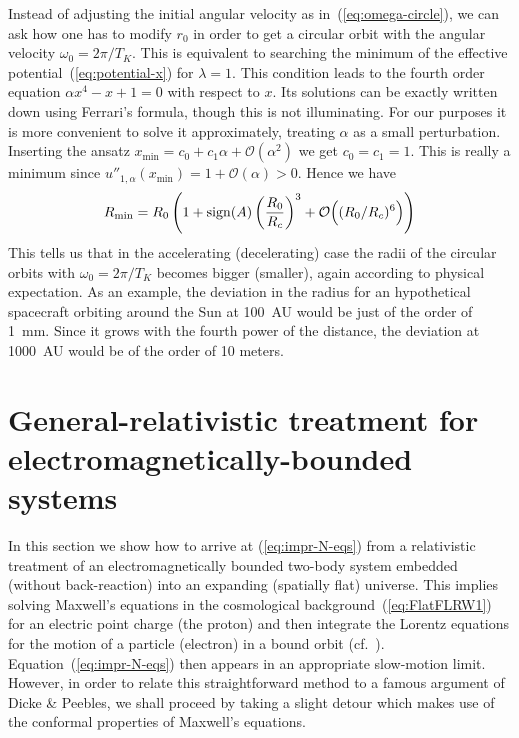 \documentclass
[rmp,aps,twocolumn,showpacs,preprintnumbers,amsmath,amssymb]{revtex4}
\theoremstyle{plain}
\theoremstyle{definition}
\theoremstyle{remark}
\newcommand{\Ord}{\mathcal{O}}                %
\begin{document}
Instead of adjusting the initial angular velocity as 
in~(\ref{eq:omega-circle}), we can ask how one has to modify 
$r_0$ in order to get a circular orbit with the angular velocity 
$\omega_0=2\pi/T_K$. This is equivalent to searching the minimum 
of the effective potential~(\ref{eq:potential-x}) for $\lambda=1$. 
This condition leads to the fourth order equation 
$\alpha x^4 - x + 1 = 0$ with respect to $x$. Its solutions can be 
exactly written down using Ferrari's formula, though this is not 
illuminating. For our purposes it is more convenient to solve it 
approximately, treating $\alpha$ as a small perturbation. 
Inserting the ansatz $x_{\mathrm{min}}=c_0+c_1\alpha+\Ord(\alpha^2)$ we get
$c_0=c_1=1$. This is really a minimum since 
$u''_{1,\alpha}(x_{\mathrm{min}})=1+\Ord(\alpha)>0$. Hence we have
%
\begin{equation}\label{eq:r-min}
R_{\rm min} = R_0
  \left( 1 + \mathrm{sign}(A)\left( \frac{R_0}{R_c} \right)^3 
           + \Ord\Big( (R_0/R_c)^6 \Big) 
  \right)
\end{equation}
%
This tells us that in the accelerating (decelerating) case the radii of 
the circular orbits with $\omega_0=2\pi/T_K$ becomes bigger (smaller), 
again according to physical expectation. As an example, the deviation 
in the radius for an hypothetical spacecraft orbiting around the Sun 
at 100~AU would be just of the order of 1~mm. Since it grows with the 
fourth power of the distance, the deviation at 1000~AU would be of 
the order of 10 meters.



\section{General-relativistic treatment for electromagnetically-bounded systems}
\label{sec:DickePeebles}
%
In this section we show how to arrive at (\ref{eq:impr-N-eqs})
from a relativistic treatment of an electromagnetically 
bounded two-body system embedded (without back-reaction) into 
an expanding (spatially flat) universe.
This implies solving Maxwell's equations in the cosmological 
background~(\ref{eq:FlatFLRW1}) for an electric point charge (the 
proton) and then integrate the Lorentz equations for the motion of
a particle (electron) in a bound orbit (cf.~\cite{Bonnor:1999}). 
Equation~(\ref{eq:impr-N-eqs}) then appears in an appropriate 
slow-motion limit. However, in order to relate this straightforward 
method to a famous argument of Dicke \& Peebles, we shall proceed 
by taking a slight detour which makes use of the conformal properties 
of Maxwell's equations.
\end{document}
